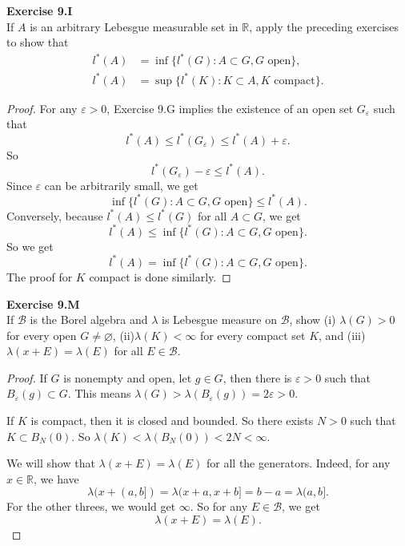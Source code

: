 \documentclass[12pt, a4paper]{article}
\theoremstyle{plain}
\newcommand{\B}{\mathscr{B}}
\newcommand{\R}{\mathbb{R}}
\def\epsilon{\varepsilon}
\newenvironment{exercise}[2][Exercise]
    { \begin{mdframed}[backgroundcolor=gray!20] \textbf{#1 #2} \\}
    {  \end{mdframed}}
\begin{document}
\begin{exercise}{9.I}
    If $A$ is an arbitrary Lebesgue measurable set in $\R$, apply the preceding exercises to show that
    \begin{align*}
        l^*(A) &= \inf\{l^*(G):A\subset G, G \text{ open}\},\\
        l^*(A) &= \sup\{l^*(K):K\subset A,K\text{ compact}\}.
    \end{align*}
\end{exercise}
    \begin{proof}
        For any $\epsilon>0$, Exercise 9.G implies the existence of an open set $G_\epsilon$ such that
        \[
        l^*(A)\leq l^*(G_\epsilon)\leq l^*(A)+\epsilon.
        \]
        So 
        \[
        l^*(G_\epsilon)-\epsilon\leq l^*(A).
        \]
        Since $\epsilon$ can be arbitrarily small, we get
        \[
        \inf\{l^*(G):A\subset G,G\text{ open}\} \leq l^*(A).
        \]
        Conversely, because $l^*(A)\leq l^*(G)$ for all $A\subset G$, we get
        \[
        l^*(A)\leq \inf\{l^*(G):A\subset G,G\text{ open}\}.
        \]
        So we get 
        \[
        l^*(A) = \inf\{l^*(G):A\subset G,G\text{ open}\}.
        \]
        The proof for $K$ compact is done similarly.
    \end{proof}

\begin{exercise}{9.M}
    If $\B$ is the Borel algebra and $\lambda$ is Lebesgue measure on $\B$, show (i) $\lambda(G)>0$ for every open $G\neq\varnothing$, (ii)$\lambda(K)<\infty$ for every compact set $K$, and (iii) $\lambda(x+E)=\lambda(E)$ for all $E\in\B$.
\end{exercise}
    \begin{proof}
        If $G$ is nonempty and open, let $g\in G$, then there is $\epsilon>0$ such that $B_\epsilon(g)\subset G$. This means $\lambda(G)>\lambda(B_\epsilon(g))=2\epsilon>0$.

        If $K$ is compact, then it is closed and bounded. So there exists $N>0$ such that $K\subset B_N(0)$. So $\lambda(K)<\lambda(B_N(0))<2N<\infty$.

        We will show that $\lambda(x+E)=\lambda(E)$ for all the generators. Indeed, for any $x\in\R$, we have
        \[ 
        \lambda(x+(a,b])=\lambda(x+a,x+b] = b-a = \lambda(a,b].
        \]
        For the other threes, we would get $\infty$. So for any $E\in\B$, we get
        \[
        \lambda(x+E)=\lambda(E).
        \]
    \end{proof}
\end{document}
